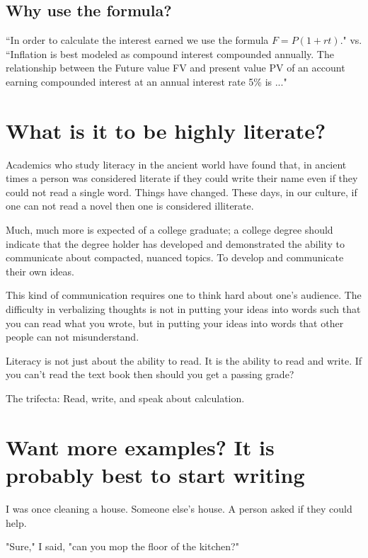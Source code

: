 \documentclass[12pt]{article}
\begin{document}
\subsection{Why use the formula?}
``In order to calculate the interest earned we use the formula $F=P(1+rt)$."
vs.\\
``Inflation is best modeled as compound interest compounded annually. The relationship between the Future value FV and present value PV of an account earning compounded interest at an annual interest rate  5\% is ..." 

\section*{What is it to be highly literate?}
Academics who study literacy in the ancient world have found that, in ancient times a person was considered literate if they could write their name even if they could not read a single word. Things have changed. These days, in our culture, if one can not read a novel then one is considered illiterate. 

Much, much more is expected of a college graduate;  a college degree should indicate that the degree holder has developed and demonstrated the ability to communicate about compacted, nuanced topics. To develop and communicate their own ideas. 

This kind of communication requires one to think hard about one's audience. The difficulty in verbalizing thoughts is not in putting your ideas into words such that you can read what you wrote, but in putting your ideas into words that other people can not misunderstand. 

Literacy is not just about the ability to read. It is the ability to read and write. If you can't read the text book then should you get a passing grade? 


The trifecta: Read, write, and speak about calculation.


\section{Want more examples? It is probably best to start writing}
I was once cleaning a house. Someone else's house. A person asked if they could help. 

"Sure," I said, "can you mop the floor of the kitchen?" 
\end{document}
